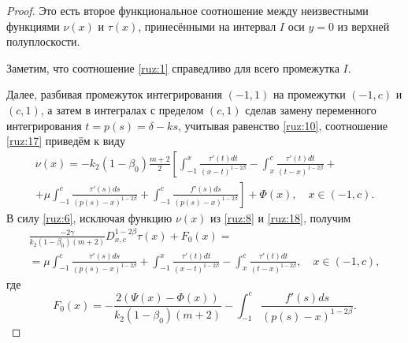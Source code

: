 \begin{proof}
Это есть второе функциональное соотношение между неизвестными
функциями $\nu(x)$ и $\tau(x)$, принесёнными на интервал
$I$ оси $y=0$ из  верхней полуплоскости.

Заметим, что соотношение \eqref{ruz:1} справедливо для всего промежутка $I$.

Далее, разбивая промежуток интегрирования $(-1, 1)$  на промежутки \linebreak $(-1, c)$ и $(c, 1)$, а затем  в интегралах с пределом
$(c, 1)$ сделав замену переменного интегрирования $t=p(s)=\delta-ks$,
учитывая равенство \eqref{ruz:10}, соотношение \eqref{ruz:17} приведём к виду
\begin{multline}
\nu(x)=-k_2(1-\beta_0)\frac{m+2}{2}\left[\int_{-1}^x{\frac{\tau'(t)dt}{(x-t)^{1-2\beta}}}-\int_x^c{\frac{\tau'(t)dt}{(t-x)^{1-2\beta}}}+\right.
\\
+\left.\mu\int_{-1}^c{\frac{\tau'(s)ds}{(p(s)-x)^{1-2\beta}}}+\int_{-1}^c{\frac{f'(s)ds}{(p(s)-x)^{1-2\beta}}}\right]+\Phi(x), \quad x\in( - 1, c).
\label{ruz:18}
\end{multline}
В силу \eqref{ruz:6}, исключая функцию $\nu(x)$ из \eqref{ruz:8} и \eqref{ruz:18}, получим
\begin{multline}
\frac{-2\gamma}{k_2(1-\beta_0)(m+2)}D_{x,c}^{1-2\beta}\tau(x)+F_0(x)=
\\
=\mu\int_{-1}^c{\frac{\tau'(s)ds}{(p(s)-x)^{1-2\beta}}}+\int_{-1}^x{\frac{\tau'(t)dt}{(x-t)^{1-2\beta}}}-\int_x^c{\frac{\tau'(t)dt}{(t-x)^{1-2\beta}}}, \quad x\in(-1, c),
\label{ruz:19}
\end{multline}
где
$$F_0(x)=-\frac{2(\Psi(x)-\Phi(x))}{k_2(1-\beta_0)(m+2)}-\int_{-1}^c{\frac{f'(s)ds}{(p(s)-x)^{1-2\beta}}}.$$


\end{proof}
